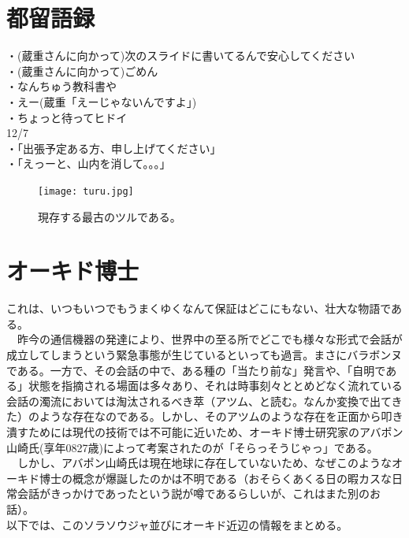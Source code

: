 \section{都留語録}
・(蔵重さんに向かって)次のスライドに書いてるんで安心してください\\
・(蔵重さんに向かって)ごめん\\
・なんちゅう教科書や\\
・えー(蔵重「えーじゃないんですよ」)\\
・ちょっと待ってヒドイ\\
 
12/7\\
・「出張予定ある方、申し上げてください」\\
・「えっーと、山内を消して。。。」\\

\begin{figure}[H]
  \centering
  \texttt{[image: turu.jpg]}
  \caption{現存する最古のツルである。}
\label{turu}
\end{figure}
\newpage
\section{オーキド博士}
これは、いつもいつでもうまくゆくなんて保証はどこにもない、壮大な物語である。\\
　昨今の通信機器の発達により、世界中の至る所でどこでも様々な形式で会話が成立してしまうという緊急事態が生じているといっても過言。まさにバラボンヌである。一方で、その会話の中で、ある種の「当たり前な」発言や、「自明である」状態を指摘される場面は多々あり、それは時事刻々ととめどなく流れている会話の濁流においては淘汰されるべき萃（アツム、と読む。なんか変換で出てきた）のような存在なのである。しかし、そのアツムのような存在を正面から叩き潰すためには現代の技術では不可能に近いため、オーキド博士研究家のアバポン山崎氏(享年0827歳)によって考案されたのが「そらっそうじゃっ」である。\\
　しかし、アバポン山崎氏は現在地球に存在していないため、なぜこのようなオーキド博士の概念が爆誕したのかは不明である（おそらくあくる日の暇カスな日常会話がきっかけであったという説が噂であるらしいが、これはまた別のお話）。\\
以下では、このソラソウジャ並びにオーキド近辺の情報をまとめる。
